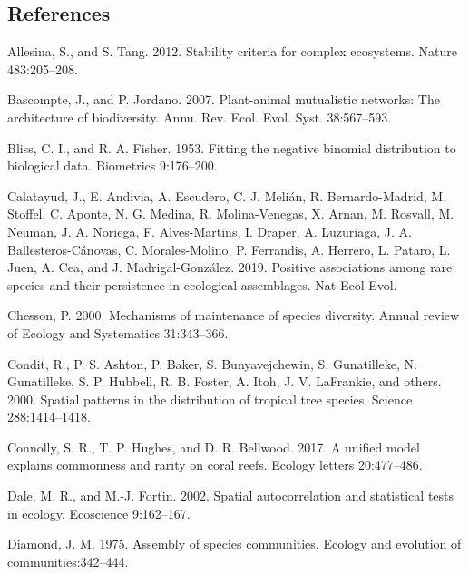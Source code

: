 \documentclass[
  letterpaper,
  DIV=11,
  numbers=noendperiod]{scrartcl}
\newlength{\cslhangindent}
\newenvironment{CSLReferences}[2] %
 {\begin{list}{}{%
  \setlength{\itemindent}{0pt}
  \setlength{\leftmargin}{0pt}
  \setlength{\parsep}{0pt}
  \ifodd #1
   \setlength{\leftmargin}{\cslhangindent}
   \setlength{\itemindent}{-1\cslhangindent}
  \fi
  \setlength{\itemsep}{#2\baselineskip}}}
 {\end{list}}
\begin{document}
\subsection*{References}\label{references}

\label{refs}
\begin{CSLReferences}{1}{0}
Allesina, S., and S. Tang. 2012. Stability criteria for complex
ecosystems. Nature 483:205--208.

Bascompte, J., and P. Jordano. 2007. Plant-animal mutualistic networks:
The architecture of biodiversity. Annu. Rev. Ecol. Evol. Syst.
38:567--593.

Bliss, C. I., and R. A. Fisher. 1953. Fitting the negative binomial
distribution to biological data. Biometrics 9:176--200.

Calatayud, J., E. Andivia, A. Escudero, C. J. Melián, R.
Bernardo-Madrid, M. Stoffel, C. Aponte, N. G. Medina, R. Molina-Venegas,
X. Arnan, M. Rosvall, M. Neuman, J. A. Noriega, F. Alves-Martins, I.
Draper, A. Luzuriaga, J. A. Ballesteros-Cánovas, C. Morales-Molino, P.
Ferrandis, A. Herrero, L. Pataro, L. Juen, A. Cea, and J.
Madrigal-González. 2019. Positive associations among rare species and
their persistence in ecological assemblages. Nat Ecol Evol.

Chesson, P. 2000. Mechanisms of maintenance of species diversity. Annual
review of Ecology and Systematics 31:343--366.

Condit, R., P. S. Ashton, P. Baker, S. Bunyavejchewin, S. Gunatilleke,
N. Gunatilleke, S. P. Hubbell, R. B. Foster, A. Itoh, J. V. LaFrankie,
and others. 2000. Spatial patterns in the distribution of tropical tree
species. Science 288:1414--1418.

Connolly, S. R., T. P. Hughes, and D. R. Bellwood. 2017. A unified model
explains commonness and rarity on coral reefs. Ecology letters
20:477--486.

Dale, M. R., and M.-J. Fortin. 2002. Spatial autocorrelation and
statistical tests in ecology. Ecoscience 9:162--167.

Diamond, J. M. 1975. Assembly of species communities. Ecology and
evolution of communities:342--444.


\end{CSLReferences}
\end{document}
